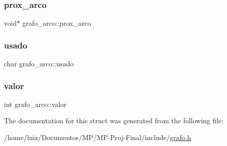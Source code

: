 \subsubsection{\texorpdfstring{prox\+\_\+arco}{prox\_arco}}
{\footnotesize\ttfamily void$\ast$ grafo\+\_\+arco\+::prox\+\_\+arco}

\mbox{\label{structgrafo__arco_ad9879f942e7387bb04a0684c58f6e746}} 
\subsubsection{\texorpdfstring{usado}{usado}}
{\footnotesize\ttfamily char grafo\+\_\+arco\+::usado}

\mbox{\label{structgrafo__arco_ac44260a9f2cf1f9e916e4590e1063c66}} 
\subsubsection{\texorpdfstring{valor}{valor}}
{\footnotesize\ttfamily int grafo\+\_\+arco\+::valor}



The documentation for this struct was generated from the following file\+:\begin{DoxyCompactItemize}
\item 
/home/luiz/\+Documentos/\+M\+P/\+M\+P-\/\+Proj-\/\+Final/include/\hyperlink{grafo_8h}{grafo.\+h}\end{DoxyCompactItemize}
